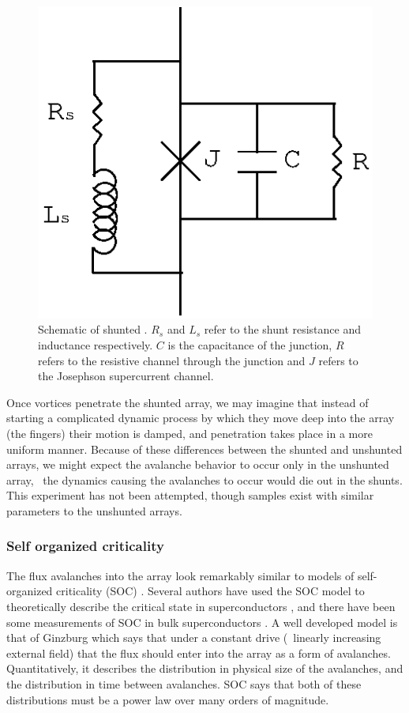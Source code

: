\begin{figure}[p]
\includegraphics{figs/prospective/shunt_sketch.eps}
\caption[Schematic of shunted \jjnoun.]
{Schematic of shunted \jjnoun. $R_s$ and $L_s$ refer to the 
shunt resistance and inductance respectively. $C$ is the capacitance
of the junction, $R$ refers to the resistive channel through the
junction and $J$ refers to the Josephson supercurrent channel. }
\label{fig:RCSJ_shunt_schematic}
\end{figure}

Once vortices penetrate the shunted array, we may imagine that instead of 
starting a complicated dynamic process by which they move deep into the
array (the fingers) their motion is damped, and penetration takes place 
in a more uniform manner.
Because of these differences between the shunted and unshunted arrays,
we might expect the avalanche behavior to occur only in the 
unshunted array, \ie\ the dynamics causing the avalanches to 
occur would die out in the shunts. This experiment has not 
been attempted, though samples exist with similar parameters to 
the unshunted arrays. 


\subsubsection{Self organized criticality}

The flux avalanches into the array look remarkably similar to 
models of self-organized criticality (SOC) \cite{bak_59_381_1987}. 
Several authors have used the SOC model to theoretically describe the critical
state in superconductors
\cite{ginzburg_jetp_79_334_1994,tang_physa_194_315_1993}, and there have
been some measurements of SOC in bulk superconductors
\cite{shi_ieee_5_1721_1995}. A well developed model is that of 
Ginzburg \cite{ginzburg_jetp_79_334_1994} which
says that under a constant drive (\ie\ linearly 
increasing external field) that the flux should enter into the 
array as a form of avalanches. Quantitatively, it describes the 
distribution in physical size of the avalanches, and the distribution
in time between avalanches. SOC says that both of these distributions
must be a power law over many orders of magnitude. 

